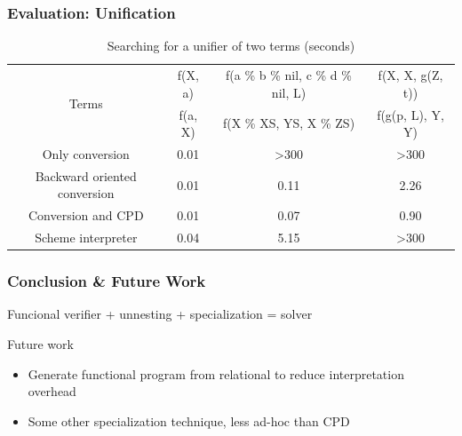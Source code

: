 \documentclass[xcolor=table]{beamer}
\begin{document}
\begin{frame}[fragile]
  \transwipe[direction=90]
  \frametitle{Evaluation: Unification}
\begin{table}
\tiny
\centering
\begin{tabular}{c|c|c|c}
\multirow{ 2}{*}{Terms} & 
f(X, a) & f(a \% b \% nil, c \% d \% nil, L) & f(X, X, g(Z, t))  \\
\cline{2-4} &
f(a, X) & f(X \% XS, YS, X \% ZS) & f(g(p, L), Y, Y)  \\
\hline\hline
Only conversion               & 0.01  &  >300 & >300 \\
\hline
Backward oriented conversion  & 0.01  &  0.11 & 2.26  \\
\hline
Conversion and CPD            & 0.01  &  0.07 & 0.90  \\
\hline

Scheme interpreter            & 0.04  & 5.15 & >300   \\
\end{tabular}
 \caption{Searching for a unifier of two terms (seconds)}
    \label{tab:uni}
\end{table}
\end{frame}

\begin{frame}[fragile]
  \transwipe[direction=90]
  \frametitle{Conclusion \& Future Work}
\begin{center} 
Funcional verifier + unnesting + specialization = solver
\end{center}
 
\vspace{15pt} 
 
Future work
 
\begin{itemize} 
  \item Generate functional program from relational to reduce interpretation overhead
  \item Some other specialization technique, less ad-hoc than CPD

\end{itemize} 
\end{frame}
\end{document}
